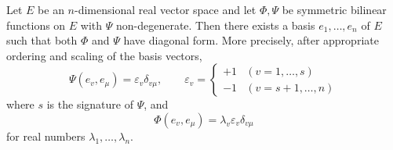 Let $E$ be an $n$-dimensional real vector space and let $\Phi, \Psi$ be symmetric bilinear functions on $E$ with $\Psi$ non-degenerate. Then there exists a basis $e_1, \ldots, e_n$ of $E$ such that both $\Phi$ and $\Psi$ have diagonal form. More precisely, after appropriate ordering and scaling of the basis vectors,
$$\Psi(e_v, e_\mu) = \varepsilon_v \delta_{v\mu}, \qquad \varepsilon_v = \begin{cases} +1 & (v = 1, \ldots, s) \\ -1 & (v = s+1, \ldots, n) \end{cases}$$
where $s$ is the signature of $\Psi$, and
$$\Phi(e_v, e_\mu) = \lambda_v \varepsilon_v \delta_{v\mu}$$
for real numbers $\lambda_1, \ldots, \lambda_n$.

